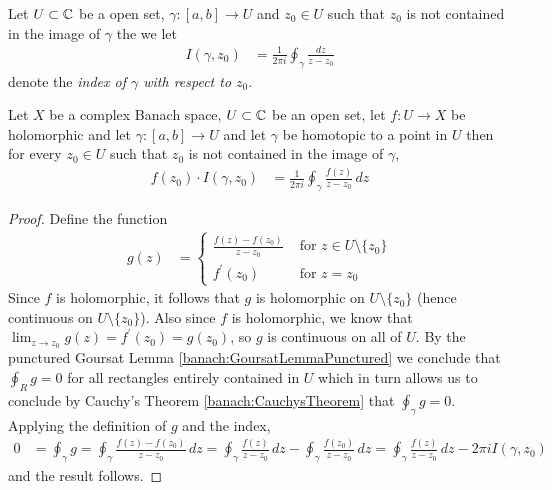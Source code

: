\begin{defn}Let $U \subset \mathbb{C}$ be a open set, $\gamma : [a,b] \to U$ and $z_0 \in U$ such that $z_0$ is not contained in the image of $\gamma$ the we let
  \begin{align*}
    I(\gamma, z_0) &= \frac{1}{2\pi i}\oint_\gamma \frac{dz}{z - z_0}
  \end{align*}
  denote the \emph{index of $\gamma$ with respect to $z_0$}.
\end{defn}

\begin{thm}\label{banach:CauchysIntegralFormula}Let $X$ be a complex Banach space, $U \subset \mathbb{C}$ be an open set, let $f: U \to X$ be holomorphic and let  $\gamma : [a,b] \to U$ and let $\gamma$ be homotopic to a point in $U$ then for every $z_0 \in U$ such that $z_0$ is not contained in the image of $\gamma$,
  \begin{align*}
   f(z_0) \cdot I(\gamma, z_0) &= \frac{1}{2\pi i} \oint_\gamma \frac{f(z)}{z - z_0} \, dz
  \end{align*}
\end{thm}
\begin{proof}
  Define the function
  \begin{align*}
    g(z) &= \begin{cases}
      \frac{f(z) - f(z_0)}{z-z_0} & \text{ for $z \in U \setminus \lbrace z_0 \rbrace$} \\
      f^\prime(z_0) & \text{ for $z = z_0$}
    \end{cases}
  \end{align*}
  Since $f$ is holomorphic, it follows that $g$ is holomorphic on $U \setminus \lbrace z_0 \rbrace$ (hence continuous on $U \setminus \lbrace z_0 \rbrace$).  Also since $f$ is holomorphic, we know that $\lim_{z \to z_0} g(z) = f^\prime(z_0) = g(z_0)$, so $g$ is continuous on all of $U$.   By the punctured Goursat Lemma \ref{banach:GoursatLemmaPunctured} we conclude that $\oint_R g = 0$ for all rectangles entirely contained in $U$ which in turn allows us to conclude by Cauchy's Theorem \ref{banach:CauchysTheorem} that $\oint_\gamma g = 0$.  Applying the definition of $g$ and the index,
  \begin{align*}
    0 &= \oint_\gamma g = \oint_\gamma  \frac{f(z) - f(z_0)}{z-z_0}  \, dz = \oint_\gamma  \frac{f(z)}{z-z_0}  \, dz - \oint_\gamma  \frac{f(z_0)}{z-z_0}  \, dz = \oint_\gamma  \frac{f(z)}{z-z_0}  \, dz - 2 \pi i I(\gamma, z_0)
  \end{align*}
  and the result follows.
\end{proof}

